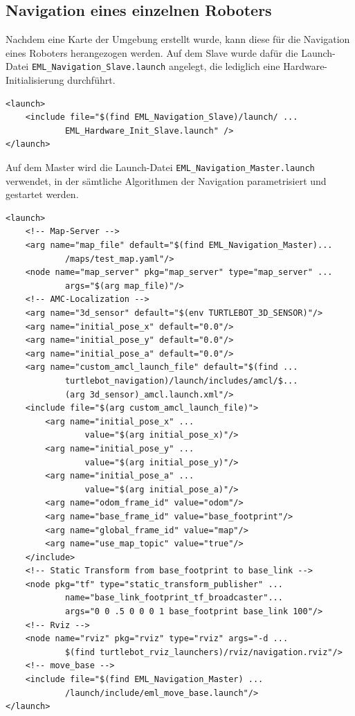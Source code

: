 \subsection{Navigation eines einzelnen Roboters}
Nachdem eine Karte der Umgebung erstellt wurde, kann diese für die Navigation eines Roboters herangezogen werden. Auf dem Slave wurde dafür die Launch-Datei \lstinline{EML_Navigation_Slave.launch}{} angelegt, die lediglich eine Hardware-Initialisierung durchführt.
\begin{lstlisting}[caption={EML\_Navigation\_Slave.launch},captionpos=b]
<launch>
	<include file="$(find EML_Navigation_Slave)/launch/ ...
			EML_Hardware_Init_Slave.launch" />
</launch>
\end{lstlisting}
Auf dem Master wird die Launch-Datei \lstinline{EML_Navigation_Master.launch}{} verwendet, in der sämtliche Algorithmen der Navigation parametrisiert und gestartet werden.
\begin{lstlisting}[caption={EML\_Navigation\_Master.launch},captionpos=b]
<launch>
	<!-- Map-Server -->
	<arg name="map_file" default="$(find EML_Navigation_Master)...
			/maps/test_map.yaml"/>
	<node name="map_server" pkg="map_server" type="map_server" ...
			args="$(arg map_file)"/>
	<!-- AMC-Localization -->
	<arg name="3d_sensor" default="$(env TURTLEBOT_3D_SENSOR)"/>
	<arg name="initial_pose_x" default="0.0"/>
	<arg name="initial_pose_y" default="0.0"/>
	<arg name="initial_pose_a" default="0.0"/>
	<arg name="custom_amcl_launch_file" default="$(find ...
			turtlebot_navigation)/launch/includes/amcl/$...
			(arg 3d_sensor)_amcl.launch.xml"/>
	<include file="$(arg custom_amcl_launch_file)">
		<arg name="initial_pose_x" ...
				value="$(arg initial_pose_x)"/>
		<arg name="initial_pose_y" ...
				value="$(arg initial_pose_y)"/>
		<arg name="initial_pose_a" ...
				value="$(arg initial_pose_a)"/>
		<arg name="odom_frame_id" value="odom"/>
		<arg name="base_frame_id" value="base_footprint"/>
		<arg name="global_frame_id" value="map"/>
		<arg name="use_map_topic" value="true"/>
	</include>
	<!-- Static Transform from base_footprint to base_link -->
	<node pkg="tf" type="static_transform_publisher" ...
			name="base_link_footprint_tf_broadcaster"...
			args="0 0 .5 0 0 0 1 base_footprint base_link 100"/>
	<!-- Rviz -->
	<node name="rviz" pkg="rviz" type="rviz" args="-d ...
			$(find turtlebot_rviz_launchers)/rviz/navigation.rviz"/>
	<!-- move_base -->
	<include file="$(find EML_Navigation_Master) ...
			/launch/include/eml_move_base.launch"/>
</launch>
\end{lstlisting}


